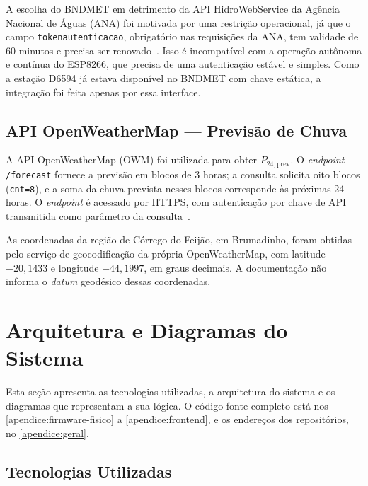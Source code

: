 A escolha do BNDMET em detrimento da API HidroWebService da Agência
Nacional de Águas (ANA) foi motivada por uma restrição operacional, já que o campo \texttt{tokenautenticacao}, obrigatório nas requisições da ANA,
tem validade de 60 minutos e precisa ser renovado~\cite[p.~4]{ana_hidrowebservice}.
Isso é incompatível com a operação autônoma e contínua do ESP8266, que
precisa de uma autenticação estável e simples. Como a estação D6594
já estava disponível no BNDMET com chave estática, a integração foi
feita apenas por essa interface.

\subsection{API OpenWeatherMap — Previsão de Chuva}
\label{subsec:owm}

A API OpenWeatherMap (OWM) foi utilizada para obter
$P_{24,\mathrm{prev}}$. O \textit{endpoint} \texttt{/forecast} fornece a
previsão em blocos de 3 horas; a consulta solicita oito blocos
(\texttt{cnt=8}), e a soma da chuva prevista nesses blocos corresponde às
próximas 24 horas.
O \textit{endpoint} é acessado por HTTPS, com autenticação por chave de
API transmitida como parâmetro da consulta~\cite{openweathermap_forecast5}.

As coordenadas da região de Córrego do Feijão, em Brumadinho, foram
obtidas pelo serviço de geocodificação da própria OpenWeatherMap, com latitude $-20{,}1433$ e longitude $-44{,}1997$, em graus decimais. A
documentação não informa o \textit{datum} geodésico dessas
coordenadas.

\section{Arquitetura e Diagramas do Sistema}
\label{sec:arquitetura-diagramas}

Esta seção apresenta as tecnologias utilizadas, a arquitetura do sistema
e os diagramas que representam a sua lógica. O código-fonte completo está
nos \autoref{apendice:firmware-fisico} a \autoref{apendice:frontend}, e
os endereços dos repositórios, no \autoref{apendice:geral}.

\subsection{Tecnologias Utilizadas}
\label{subsec:ambiente}

